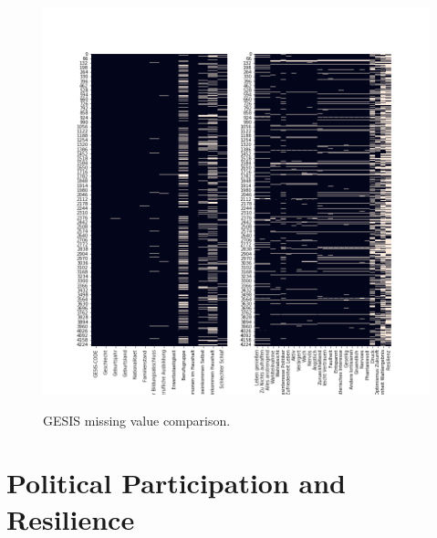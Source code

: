 \begin{figure}[ht]
	\begin{center}
		\includegraphics[scale=0.50,angle=0]{fig/gesis_missing}
		\label{std}
		\caption{GESIS missing value comparison.}
	\end{center}
\end{figure}

\section{Political Participation and Resilience}

